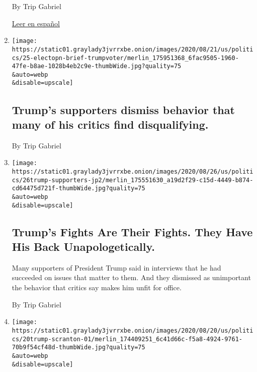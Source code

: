 \begin{enumerate}
  By Trip Gabriel

  \href{https://www.nytimes3xbfgragh.onion/es/2020/09/04/espanol/estados-unidos/elecciones-estados-unidos.html}{Leer
  en español}
\item
  \href{/2020/08/25/us/elections/trumps-supporters-dismiss-behavior-that-many-of-his-critics-find-disqualifying.html}{}

  \texttt{[image: https://static01.graylady3jvrrxbe.onion/images/2020/08/21/us/politics/25-electopn-brief-trumpvoter/merlin\_175951368\_6fac9505-1960-47fe-b8ae-1028b4eb2c9e-thumbWide.jpg?quality=75\\\&auto=webp\\\&disable=upscale]}

  \hypertarget{trumps-supporters-dismiss-behavior-that-many-of-his-critics-find-disqualifying}{%
  \subsection{Trump's supporters dismiss behavior that many of his
  critics find
  disqualifying.}\label{trumps-supporters-dismiss-behavior-that-many-of-his-critics-find-disqualifying}}

  By Trip Gabriel
\item
  \href{/2020/08/25/us/politics/trump-reelection-supporters.html}{}

  \texttt{[image: https://static01.graylady3jvrrxbe.onion/images/2020/08/26/us/politics/26trump-supporters-jp2/merlin\_175551630\_a19d2f29-c15d-4449-b874-cd64475d721f-thumbWide.jpg?quality=75\\\&auto=webp\\\&disable=upscale]}

  \hypertarget{trumps-fights-are-their-fights-they-have-his-back-unapologetically}{%
  \subsection{Trump's Fights Are Their Fights. They Have His Back
  Unapologetically.}\label{trumps-fights-are-their-fights-they-have-his-back-unapologetically}}

  Many supporters of President Trump said in interviews that he had
  succeeded on issues that matter to them. And they dismissed as
  unimportant the behavior that critics say makes him unfit for office.

  By Trip Gabriel
\item
  \href{/2020/08/20/us/politics/trump-pennsylvania.html}{}

  \texttt{[image: https://static01.graylady3jvrrxbe.onion/images/2020/08/20/us/politics/20trump-scranton-01/merlin\_174409251\_6c41d66c-f5a8-4924-9761-70b9f54cf48d-thumbWide.jpg?quality=75\\\&auto=webp\\\&disable=upscale]}


\end{enumerate}
